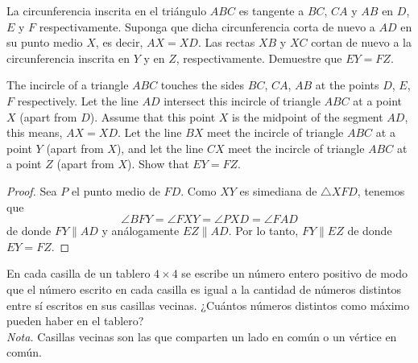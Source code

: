 \begin{probMG}[IberoAmerican 1995/5]
	La circunferencia inscrita en el triángulo $ABC$ es tangente a $BC$, $CA$ y $AB$ en $D$, $E$ y $F$ respectivamente. Suponga que dicha circunferencia corta de nuevo a $AD$ en su punto medio $X$, es decir, $AX=XD$. Las rectas $XB$ y $XC$ cortan de nuevo a la circunferencia inscrita en $Y$ y en $Z$, respectivamente. Demuestre que $EY=FZ$.
	\begin{hint}
		The incircle of a triangle $ABC$ touches the sides $BC$, $CA$, $AB$ at the points $D$, $E$, $F$ respectively. Let the line $AD$ intersect this incircle of triangle $ABC$ at a point $X$ (apart from $D$). Assume that this point $X$ is the midpoint of the segment $AD$, this means, $AX=XD$. Let the line $BX$ meet the incircle of triangle $ABC$ at a point $Y$ (apart from $X$), and let the line $CX$ meet the incircle of triangle $ABC$ at a point $Z$ (apart from $X$). Show that $EY=FZ$.
	\end{hint}
\end{probMG}

\begin{proof}
	Sea $P$ el punto medio de $FD$. Como $XY$ es simediana de $\triangle XFD$, tenemos que
	\[\angle BFY=\angle FXY=\angle PXD=\angle FAD\]
	de donde $FY\parallel AD$ y análogamente $EZ\parallel AD$. Por lo tanto, $FY\parallel EZ$ de donde $EY=FZ$.
\end{proof}


\begin{probEB}
	En cada casilla de un tablero $4\times 4$ se escribe un número entero positivo de modo que el número escrito en cada casilla es igual a la cantidad de números distintos entre sí escritos en sus casillas vecinas. ¿Cuántos números distintos como máximo pueden haber en el tablero?\\[4pt]
	\emph{Nota.} Casillas vecinas son las que comparten un lado en común o un vértice en común.
\end{probEB}

